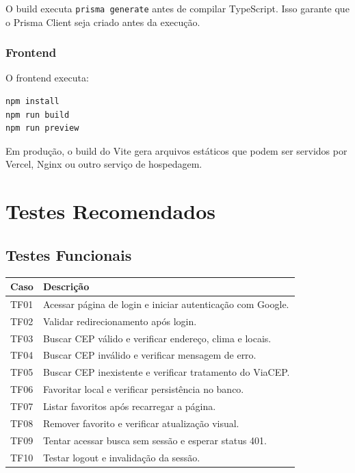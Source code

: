 \documentclass[
    12pt,
    oneside,
    openright,
    a4paper,
    english,
    brazil
]{abntex2}
\begin{document}
O build executa \texttt{prisma generate} antes de compilar TypeScript. Isso garante que o Prisma Client seja criado antes da execução.

\subsection{Frontend}

O frontend executa:

\begin{lstlisting}[language=bash]
npm install
npm run build
npm run preview
\end{lstlisting}

Em produção, o build do Vite gera arquivos estáticos que podem ser servidos por Vercel, Nginx ou outro serviço de hospedagem.


\chapter{Testes Recomendados}

\section{Testes Funcionais}

\begin{longtable}{|p{3cm}|p{11cm}|}
\hline
\textbf{Caso} & \textbf{Descrição} \\
\hline
TF01 & Acessar página de login e iniciar autenticação com Google. \\
\hline
TF02 & Validar redirecionamento após login. \\
\hline
TF03 & Buscar CEP válido e verificar endereço, clima e locais. \\
\hline
TF04 & Buscar CEP inválido e verificar mensagem de erro. \\
\hline
TF05 & Buscar CEP inexistente e verificar tratamento do ViaCEP. \\
\hline
TF06 & Favoritar local e verificar persistência no banco. \\
\hline
TF07 & Listar favoritos após recarregar a página. \\
\hline
TF08 & Remover favorito e verificar atualização visual. \\
\hline
TF09 & Tentar acessar busca sem sessão e esperar status 401. \\
\hline
TF10 & Testar logout e invalidação da sessão. \\
\hline
\end{longtable}
\end{document}
